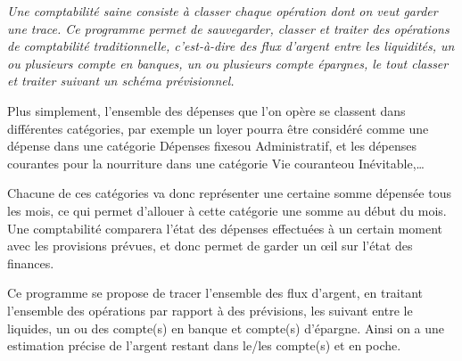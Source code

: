 {\it%
Une comptabilité saine consiste à classer chaque opération
dont on veut garder une trace. Ce programme permet de
sauvegarder, classer et traiter des opérations de comptabilité
traditionnelle, c'est-à-dire des flux d'argent entre les liquidités,
un ou plusieurs compte en banques, un ou plusieurs compte épargnes,
le tout classer et traiter suivant un schéma prévisionnel.

Plus simplement, l'ensemble des dépenses que l'on opère se
classent dans différentes catégories, par exemple un loyer pourra être considéré
comme une dépense dans une catégorie \og Dépenses fixes\fg ou 
\og Administratif\fg, et les dépenses courantes pour la nourriture dans
une catégorie \og Vie courante\fg ou \og Inévitable\fg,\dots

Chacune de ces catégories va donc représenter une certaine somme
dépensée tous les mois, ce qui permet d'allouer à cette catégorie
une somme au début du mois. Une comptabilité comparera l'état
des dépenses effectuées à un certain moment avec les provisions
prévues, et donc permet de garder un \oe il sur l'état des
finances.

Ce programme se propose de tracer l'ensemble des flux d'argent,
en traitant l'ensemble des opérations par rapport à des prévisions,
les suivant entre le liquides, un ou des compte(s) en banque et compte(s)
d'épargne. Ainsi on a une estimation précise de l'argent restant dans le/les
compte(s) et en poche.
}
